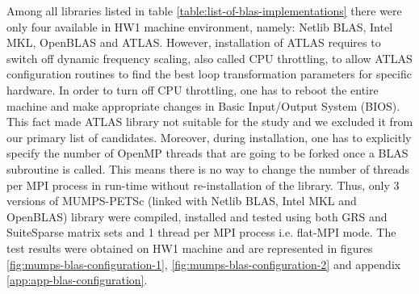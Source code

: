 Among all libraries listed in table \ref{table:list-of-blas-implementations} there were only four available in HW1 machine environment, namely: Netlib BLAS, Intel MKL, OpenBLAS and ATLAS. However, installation of ATLAS requires to switch off dynamic frequency scaling, also called CPU throttling, to allow ATLAS configuration routines to find the best loop transformation parameters for specific hardware. In order to turn off CPU throttling, one has to reboot the entire machine and make appropriate changes in Basic Input/Output System (BIOS). This fact made ATLAS library not suitable for the study and we excluded it from our primary list of candidates. Moreover, during installation, one has to explicitly specify the number of OpenMP threads that are going to be forked once a BLAS subroutine is called. This means there is no way to change the number of threads per MPI process in run-time without re-installation of the library. Thus, only 3 versions of MUMPS-PETSc (linked with Netlib BLAS, Intel MKL and OpenBLAS) library were compiled, installed and tested using both GRS and SuiteSparse matrix sets and 1 thread per MPI process i.e. flat-MPI mode. The test results were obtained on HW1 machine and are represented in figures \ref{fig:mumps-blas-configuration-1}, \ref{fig:mumps-blas-configuration-2} and appendix \ref{app:app-blas-configuration}.\\


